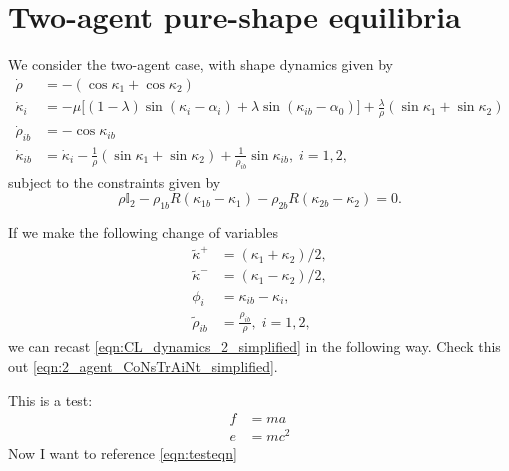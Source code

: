 \section{Two-agent pure-shape equilibria}

We consider the two-agent case, with shape dynamics given by
\begin{equation}
\begin{aligned}
\dot{\rho} &= - (\cos\kappa_1 + \cos\kappa_2) \\
\dot{\kappa}_i &= - \mu \Big[(1 - \lambda)\sin(\kappa_i - \alpha_i) + \lambda \sin(\kappa_{ib} - \alpha_0) \Big] + \frac{\lambda}{\rho}(\sin\kappa_1 + \sin\kappa_2) \\
\dot{\rho}_{ib} &= - \cos\kappa_{ib}  \\
\dot{\kappa}_{ib} &= \dot{\kappa}_i - \frac{1}{\rho}(\sin\kappa_1 + \sin\kappa_2) + \frac{1}{\rho_{ib}} \sin\kappa_{ib},  \; i=1,2,
\label{eqn:CL_dynamics_2_simplified}
\end{aligned}
\end{equation}
subject to the constraints given by
\begin{equation}
\rho \mathbb{I}_2 - \rho_{1b} R(\kappa_{1b} - \kappa_1) - \rho_{2b} R(\kappa_{2b} - \kappa_{2}) = 0. 
\label{eqn:2_agent_CoNsTrAiNt_simplified}
\end{equation}

If we make the following change of variables
\begin{align*}
\tilde{\kappa}^+ 
&= (\kappa_1 + \kappa_2)/2,
\nonumber \\
\tilde{\kappa}^- 
&= 
(\kappa_1 - \kappa_2)/2,
\nonumber \\
\phi_{i} 
&= 
\kappa_{ib} - \kappa_i,
\nonumber \\
\tilde{\rho}_{ib} 
&= 
\frac{\rho_{ib} }{\rho}, 
\; i=1,2,
\end{align*}
we can recast \eqref{eqn:CL_dynamics_2_simplified} in the following way. Check this out \eqref{eqn:2_agent_CoNsTrAiNt_simplified}.

This is a test:
\begin{eqnarray}
f &= m a \nonumber \\
e & =m c^2
\label{eqn:testeqn}
\end{eqnarray}
Now I want to reference \eqref{eqn:testeqn}
  
  
  
  
  
  
  
  
  
  
  
  
  
  
  
  
  
  
  
  
  